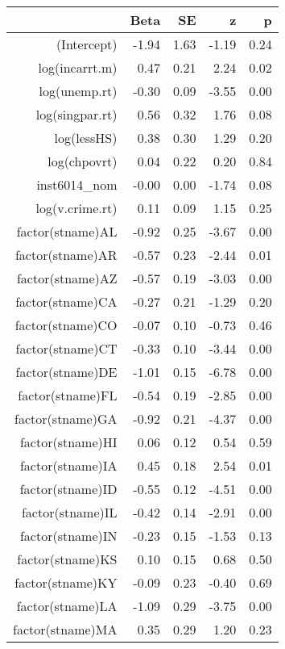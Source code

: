\begin{table}[ht]
\centering
\begin{tabular}{rrrrr}
  \hline
 & Beta & SE & z & p \\ 
  \hline
(Intercept) & -1.94 & 1.63 & -1.19 & 0.24 \\ 
  log(incarrt.m) & 0.47 & 0.21 & 2.24 & 0.02 \\ 
  log(unemp.rt) & -0.30 & 0.09 & -3.55 & 0.00 \\ 
  log(singpar.rt) & 0.56 & 0.32 & 1.76 & 0.08 \\ 
  log(lessHS) & 0.38 & 0.30 & 1.29 & 0.20 \\ 
  log(chpovrt) & 0.04 & 0.22 & 0.20 & 0.84 \\ 
  inst6014\_nom & -0.00 & 0.00 & -1.74 & 0.08 \\ 
  log(v.crime.rt) & 0.11 & 0.09 & 1.15 & 0.25 \\ 
  factor(stname)AL & -0.92 & 0.25 & -3.67 & 0.00 \\ 
  factor(stname)AR & -0.57 & 0.23 & -2.44 & 0.01 \\ 
  factor(stname)AZ & -0.57 & 0.19 & -3.03 & 0.00 \\ 
  factor(stname)CA & -0.27 & 0.21 & -1.29 & 0.20 \\ 
  factor(stname)CO & -0.07 & 0.10 & -0.73 & 0.46 \\ 
  factor(stname)CT & -0.33 & 0.10 & -3.44 & 0.00 \\ 
  factor(stname)DE & -1.01 & 0.15 & -6.78 & 0.00 \\ 
  factor(stname)FL & -0.54 & 0.19 & -2.85 & 0.00 \\ 
  factor(stname)GA & -0.92 & 0.21 & -4.37 & 0.00 \\ 
  factor(stname)HI & 0.06 & 0.12 & 0.54 & 0.59 \\ 
  factor(stname)IA & 0.45 & 0.18 & 2.54 & 0.01 \\ 
  factor(stname)ID & -0.55 & 0.12 & -4.51 & 0.00 \\ 
  factor(stname)IL & -0.42 & 0.14 & -2.91 & 0.00 \\ 
  factor(stname)IN & -0.23 & 0.15 & -1.53 & 0.13 \\ 
  factor(stname)KS & 0.10 & 0.15 & 0.68 & 0.50 \\ 
  factor(stname)KY & -0.09 & 0.23 & -0.40 & 0.69 \\ 
  factor(stname)LA & -1.09 & 0.29 & -3.75 & 0.00 \\ 
  factor(stname)MA & 0.35 & 0.29 & 1.20 & 0.23 \\ 

\end{tabular}
\end{table}
